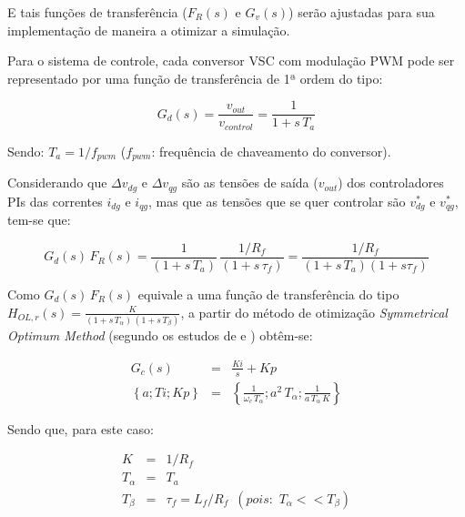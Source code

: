 E tais funções de transferência ($ F_R(s) $ e $ G_v(s) $) serão ajustadas para sua implementação de maneira a otimizar a simulação.





Para o sistema de controle, cada conversor \ac{VSC} com modulação \ac{PWM} pode ser representado por uma função de transferência de 1ª ordem do tipo:

\begin{equation}
\label{eq:funcao_pwm}
  G_{d}(s) = \frac{v_{out}}{v_{control}} = \frac{1}{1 + s\,T_a}
\end{equation}

Sendo: $T_a = 1/f_{pwm}$ ($f_{pwm}$: frequência de chaveamento do conversor).

Considerando que $\Delta v_{dg} $ e $ \Delta v_{qg} $ são as tensões de saída ($ v_{out} $) dos controladores PIs das correntes $i_{dg}$ e $i_{qg}$, mas que as tensões que se quer controlar são $  v_{dg}^* $ e $ v_{qg}^* $, tem-se que:

\begin{equation}
\label{eq:fctr_idq_g}
  G_d(s)\,F_R(s) = \frac{1}{(1 + s\,T_a)}\,\frac{1/R_f}{(1 + s\,\tau_f)} = \frac{1/R_f}{(1 + s\,T_a)(1 + s\tau_f)}
\end{equation}

Como $ G_d(s)\,F_R(s) $ equivale a uma função de transferência do tipo $ H_{OL,r}(s) = \frac{K}{(1 + s\,T_\alpha)\,(1 + s\,T_\beta)} $, a partir do método de otimização \textit{Symmetrical Optimum Method} (segundo os estudos de  e  ) obtêm-se:

\begin{eqnarray}
  G_c(s) &=& \frac{Ki}{s} + Kp
  \\
  \left \{ a; Ti; Kp \right \} &=& \left \{\frac{1}{\omega_c\,T_\alpha}; a^2\,T_\alpha; \frac{1}{a\,T_\alpha\,K} \right \}
\end{eqnarray}

Sendo que, para este caso:

\begin{eqnarray}
  K &=& 1/R_f
  \\
  T_\alpha &=& T_a
  \\
  T_\beta &=& \tau_f = L_f/R_f  \,\,\,(pois:\,\,T_\alpha << T_\beta)
\end{eqnarray}

